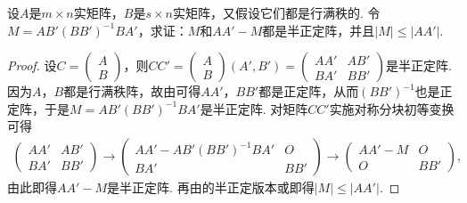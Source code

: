\documentclass[../../main.tex]{subfiles}
\begin{document}
\begin{example}\label{example:例9.81}
设\(A\)是\(m\times n\)实矩阵，\(B\)是\(s\times n\)实矩阵，又假设它们都是行满秩的. 令\(M = AB'(BB')^{-1}BA'\)，求证：\(M\)和\(AA' - M\)都是半正定阵，并且\(\vert M\vert\leqslant \vert AA'\vert\).
\end{example}
\begin{proof}
设\(C=\begin{pmatrix}A\\B\end{pmatrix}\)，则\(CC'=\begin{pmatrix}A\\B\end{pmatrix}(A',B')=\begin{pmatrix}AA'&AB'\\BA'&BB'\end{pmatrix}\)是半正定阵. 因为\(A\)，\(B\)都是行满秩阵，故由可得\(AA'\)，\(BB'\)都是正定阵，从而\((BB')^{-1}\)也是正定阵，于是\(M = AB'(BB')^{-1}BA'\)是半正定阵. 对矩阵\(CC'\)实施对称分块初等变换可得
\begin{align*}
\begin{pmatrix}AA'&AB'\\BA'&BB'\end{pmatrix}\to\begin{pmatrix}AA' - AB'(BB')^{-1}BA'&O\\BA'&BB'\end{pmatrix}\to\begin{pmatrix}AA' - M&O\\O&BB'\end{pmatrix},
\end{align*}
由此即得\(AA' - M\)是半正定阵. 再由的半正定版本或即得\(\vert M\vert\leqslant \vert AA'\vert\).

\end{proof}
\end{document}
